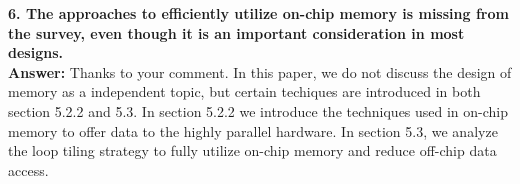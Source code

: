 \documentclass[12pt]{paper}
\newcommand{\answer}[1]{\noindent\textbf{Answer:} #1}
\newcommand{\comment}[1]{\noindent\textbf{#1}\\}
\begin{document}
\comment{6.	The approaches to efficiently utilize on-chip memory is missing from the survey, even though it is an important consideration in most designs.}

\answer{Thanks to your comment. In this paper, we do not discuss the design of memory as a independent topic, but certain techiques are introduced in both section 5.2.2 and 5.3. In section 5.2.2 we introduce the techniques used in on-chip memory to offer data to the highly parallel hardware. In section 5.3, we analyze the loop tiling strategy to fully utilize on-chip memory and reduce off-chip data access.}
\end{document}
